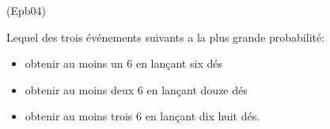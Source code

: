 \begin{tiny}(Epb04)\end{tiny} Lequel des trois événements suivants a la plus grande probabilité:
\begin{itemize}
 \item obtenir au moins un 6 en lançant six dés
 \item obtenir au moins deux 6 en lançant douze dés
 \item obtenir au moins trois 6 en lançant dix huit dés.
\end{itemize}
  